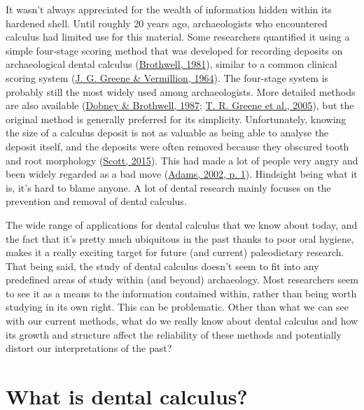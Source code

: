 \documentclass[
  b5paper,
]{book}
\begin{document}
It wasn't always appreciated for the wealth of information hidden within
its hardened shell. Until roughly 20 years ago, archaeologists who
encountered calculus had limited use for this material. Some researchers
quantified it using a simple four-stage scoring method that was
developed for recording deposits on archaeological dental calculus
(\protect\hyperlink{ref-brothwellDiggingBones1981}{Brothwell, 1981}),
similar to a common clinical scoring system
(\protect\hyperlink{ref-greeneSimplifiedOral1964}{J. G. Greene \&
Vermillion, 1964}). The four-stage system is probably still the most
widely used among archaeologists. More detailed methods are also
available (\protect\hyperlink{ref-dobneyMethodEvaluating1987}{Dobney \&
Brothwell, 1987};
\protect\hyperlink{ref-greeneQuantifyingCalculus2005}{T. R. Greene et
al., 2005}), but the original method is generally preferred for its
simplicity. Unfortunately, knowing the size of a calculus deposit is not
as valuable as being able to analyse the deposit itself, and the
deposits were often removed because they obscured tooth and root
morphology (\protect\hyperlink{ref-scottBriefHistory2015}{Scott, 2015}).
This had made a lot of people very angry and been widely regarded as a
bad move (\protect\hyperlink{ref-adamsRestaurantEnd2002}{Adams, 2002, p.
1}). Hindsight being what it is, it's hard to blame anyone. A lot of
dental research mainly focuses on the prevention and removal of dental
calculus.

The wide range of applications for dental calculus that we know about
today, and the fact that it's pretty much ubiquitous in the past thanks
to poor oral hygiene, makes it a really exciting target for future (and
current) paleodietary research. That being said, the study of dental
calculus doesn't seem to fit into any predefined areas of study within
(and beyond) archaeology. Most researchers seem to see it as a means to
the information contained within, rather than being worth studying in
its own right. This can be problematic. Other than what we can see with
our current methods, what do we really know about dental calculus and
how its growth and structure affect the reliability of these methods and
potentially distort our interpretations of the past?

\hypertarget{intro-what}{%
\section{What is dental calculus?}\label{intro-what}}
\end{document}
